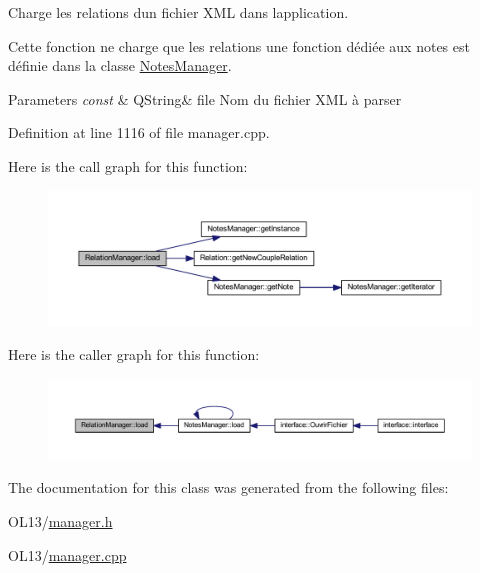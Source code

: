Charge les relations d\textquotesingle{}un fichier X\+ML dans l\textquotesingle{}application. 

Cette fonction ne charge que les relations une fonction dédiée aux notes est définie dans la classe \hyperlink{class_notes_manager}{Notes\+Manager}. 
\begin{DoxyParams}{Parameters}
{\em const} & Q\+String\& file Nom du fichier X\+ML à parser \\
\hline
\end{DoxyParams}


Definition at line 1116 of file manager.\+cpp.

Here is the call graph for this function\+:\nopagebreak
\begin{figure}[H]
\begin{center}
\leavevmode
\includegraphics[width=350pt]{class_relation_manager_a37273bc4c1d223bf99ff10ba7feba50a_cgraph}
\end{center}
\end{figure}
Here is the caller graph for this function\+:\nopagebreak
\begin{figure}[H]
\begin{center}
\leavevmode
\includegraphics[width=350pt]{class_relation_manager_a37273bc4c1d223bf99ff10ba7feba50a_icgraph}
\end{center}
\end{figure}


The documentation for this class was generated from the following files\+:\begin{DoxyCompactItemize}
\item 
O\+L13/\hyperlink{manager_8h}{manager.\+h}\item 
O\+L13/\hyperlink{manager_8cpp}{manager.\+cpp}\end{DoxyCompactItemize}
